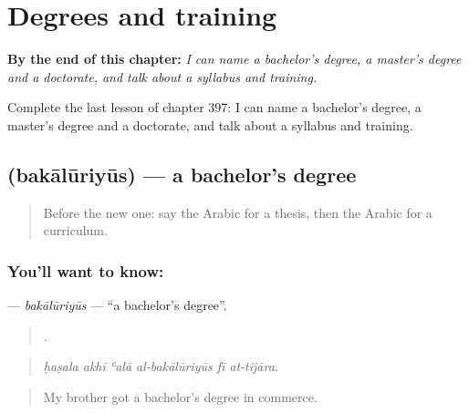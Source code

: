 
\chapter{Degrees and training}
\label{ch:ar-degrees-and-training}

\begin{chapteropening}
\textbf{By the end of this chapter:} \emph{I can name a bachelor's degree, a master's degree and a doctorate, and talk about a syllabus and training.}

Complete the last lesson of chapter 397: I can name a bachelor's degree, a master's degree and a doctorate, and talk about a syllabus and training.
\end{chapteropening}

\section[\texorpdfstring{\ar{بكالوريوس} (bakālūriyūs)}{بكالوريوس (bakālūriyūs)}]{ (bakālūriyūs) — a bachelor's degree}

\label{lesson:AR-C397-bakaluriyus}



\begin{quote}
Before the new one: say the Arabic for a thesis, then the Arabic for a curriculum.
\end{quote}

\subsection*{You'll want to know: }
\textbf{} — \emph{bakālūriyūs} — \textquotedblleft{}a bachelor's degree\textquotedblright{}.

\begin{quote}
     .
\end{quote}

\begin{quote}
\emph{ḥaṣala akhī ʿalā al-bakālūriyūs fī at-tijāra.}
\end{quote}

\begin{quote}
My brother got a bachelor's degree in commerce.
\end{quote}

